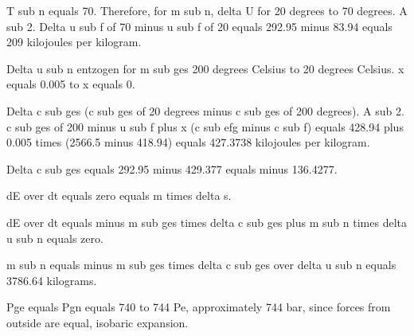 T sub n equals 70. Therefore, for m sub n, delta U for 20 degrees to 70 degrees. A sub 2. Delta u sub f of 70 minus u sub f of 20 equals 292.95 minus 83.94 equals 209 kilojoules per kilogram.

Delta u sub n entzogen for m sub ges 200 degrees Celsius to 20 degrees Celsius. x equals 0.005 to x equals 0.

Delta c sub ges (c sub ges of 20 degrees minus c sub ges of 200 degrees). A sub 2. c sub ges of 200 minus u sub f plus x (c sub efg minus c sub f) equals 428.94 plus 0.005 times (2566.5 minus 418.94) equals 427.3738 kilojoules per kilogram.

Delta c sub ges equals 292.95 minus 429.377 equals minus 136.4277.

dE over dt equals zero equals m times delta s.

dE over dt equals minus m sub ges times delta c sub ges plus m sub n times delta u sub n equals zero.

m sub n equals minus m sub ges times delta c sub ges over delta u sub n equals 3786.64 kilograms.

Pge equals Pgn equals 740 to 744 Pe, approximately 744 bar, since forces from outside are equal, isobaric expansion.
